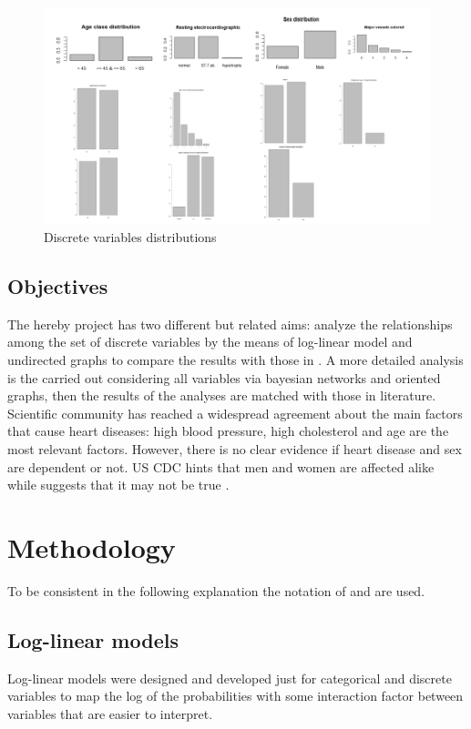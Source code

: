 \documentclass{article}
\begin{document}
\begin{figure}[H]
        \centering
       \includegraphics[width=1\textwidth]{plots.pdf}
       \caption{Discrete variables distributions}
   \end{figure}
   
\subsection{Objectives}
The hereby project has two different but related aims: analyze the relationships among the set of discrete variables by the means of log-linear model and undirected graphs to compare the results with those in \cite{Steno}. A more detailed analysis is the carried out considering all variables via bayesian networks and oriented graphs, then the results of the analyses are matched with those in literature.\\

Scientific community has reached a widespread agreement about the main factors that cause heart diseases: high blood pressure, high cholesterol and age are the most relevant factors. However, there is no clear evidence if heart disease and sex are dependent or not. US CDC hints that men and women are affected alike while suggests that it may not be true \cite{Health-related variables} \cite{CDC paper} \cite{Steno}.

\section{Methodology}
To be consistent in the following explanation the notation of \cite{book} and \cite{ArtInt} are used.

\subsection{Log-linear models}
Log-linear models were designed and developed just for categorical and discrete variables to map the log of the probabilities with some interaction factor between variables that are easier to interpret.\\
\end{document}
